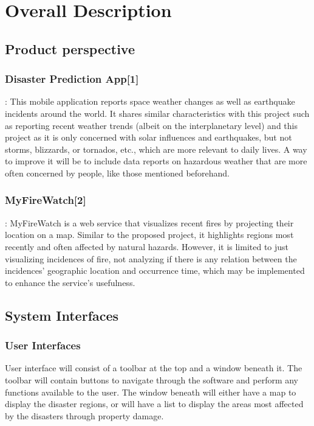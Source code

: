 \documentclass{article}
\begin{document}
  
\section{Overall Description}
\subsection{Product perspective}
\subsubsection*{Disaster Prediction App[1]} :
    This mobile application reports space weather changes as well as earthquake 
    incidents around the world. It shares similar characteristics with this project 
    such as reporting recent weather trends (albeit on the interplanetary level) and 
    this project as it is only concerned with solar influences and earthquakes, but 
    not storms, blizzards, or tornados, etc., which are more relevant to daily lives. 
    A way to improve it will be to include data reports on hazardous weather that are 
    more often concerned by people, like those mentioned beforehand.
 
\subsubsection*{MyFireWatch[2]} :
    MyFireWatch is a web service that visualizes recent fires by projecting their 
    location on a map. Similar to the proposed project, it highlights regions most 
    recently and often affected by natural hazards. However, it is limited to just 
    visualizing incidences of fire, not analyzing if there is any relation between 
    the incidences’ geographic location and occurrence time, which may be implemented 
    to enhance the service’s usefulness.

 
    \subsection{System Interfaces}
	\subsubsection{User Interfaces}
    User interface will consist of a toolbar at the top and a window beneath it. 
    The toolbar will contain buttons to navigate through the software and perform 
    any functions available to the user. The window beneath will either have a map to 
    display the disaster regions, or will have a list to display the areas most 
    affected by the disasters through property damage.
 
\end{document}
